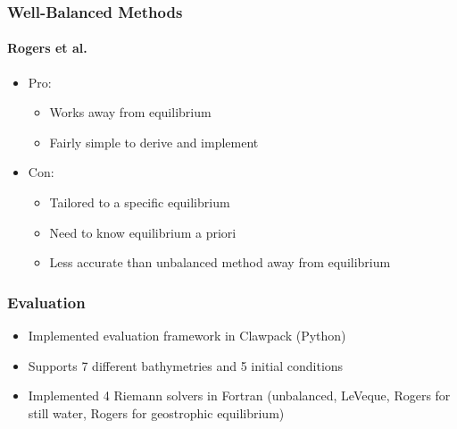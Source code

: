 \documentclass{beamer}
\begin{document}
\begin{frame}
  \frametitle{Well-Balanced Methods}
  \framesubtitle{Rogers et al.}
  \begin{itemize}
    \item Pro:
    \begin{itemize}
      \item Works away from equilibrium
      \item Fairly simple to derive and implement
    \end{itemize}
    \item Con:
    \begin{itemize}
      \item Tailored to a specific equilibrium
      \item Need to know equilibrium a priori
      \item Less accurate than unbalanced method away from equilibrium
    \end{itemize}
  \end{itemize}
\end{frame}

\begin{frame}
  \frametitle{Evaluation}
  \begin{itemize}
    \item Implemented evaluation framework in Clawpack (Python)
    \item Supports 7 different bathymetries and 5 initial conditions
    \item Implemented 4 Riemann solvers in Fortran (unbalanced, LeVeque, Rogers for still water, Rogers for geostrophic equilibrium)
  \end{itemize}
\end{frame}




\end{document}
